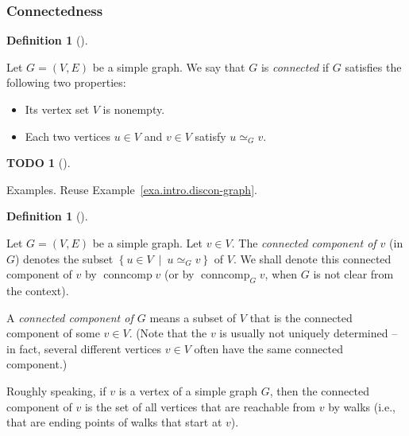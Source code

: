 \documentclass[numbers=enddot,12pt,final,onecolumn,notitlepage]{scrartcl}%
\theoremstyle{definition}
\newtheorem{defi}[theo]{Definition}
\newenvironment{definition}[1][]
{\begin{defi}[#1]\begin{leftbar}}
{\end{leftbar}\end{defi}}
\newtheorem{quest}[theo]{TODO}
\newenvironment{todo}[1][]
{\begin{quest}[#1]\begin{leftbar}}
{\end{leftbar}\end{quest}}
\newcommand{\conncomp}{\operatorname{conncomp}}
\newcommand{\set}[1]{\left\{ #1 \right\}}
\newcommand{\tup}[1]{\left( #1 \right)}
\begin{document}
\subsubsection{\label{subsect.intro.connected}Connectedness}

\begin{definition}
Let $G = \tup{V, E}$ be a simple graph. We say that $G$ is
\textit{connected} if $G$ satisfies the following two properties:
\begin{itemize}
\item Its vertex set $V$ is nonempty.
\item Each two vertices $u \in V$ and $v \in V$ satisfy
$u \simeq_G v$.
\end{itemize}
\end{definition}

\begin{todo}
Examples. Reuse Example~\ref{exa.intro.discon-graph}.
\end{todo}

\begin{definition}
Let $G = \tup{V, E}$ be a simple graph. Let $v \in V$. The
\textit{connected component of $v$} (in $G$) denotes the subset
$\set{ u \in V \ \mid \  u \simeq_G v }$ of $V$.
We shall denote this connected component of $v$ by
$\conncomp v$ (or by $\conncomp_G v$, when $G$ is not clear from the
context).

A \textit{connected component of $G$} means a subset of $V$ that is
the connected component of some $v \in V$. (Note that the $v$ is
usually not uniquely determined -- in fact, several different vertices
$v \in V$ often have the same connected component.)
\end{definition}

Roughly speaking, if $v$ is a vertex of a simple graph $G$, then
the connected component of $v$ is the set of all vertices that are
reachable from $v$ by walks (i.e., that are ending points of walks
that start at $v$).
\end{document}
